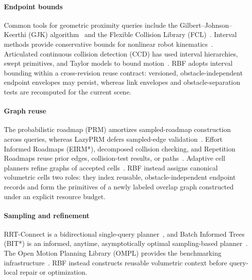 \documentclass[journal]{IEEEtran}
\newcommand{\rbf}{RBF}
\begin{document}
\paragraph{Endpoint bounds}
\label{sec:related_endpoint_bounds}
Common tools for geometric proximity queries include the
Gilbert--Johnson--Keerthi (GJK) algorithm~\cite{gilbert1988fast} and the
  Flexible Collision Library (FCL)~\cite{pan2012fcl}. Interval methods provide
conservative bounds for nonlinear robot kinematics~\cite{moore2009introduction,
merlet2009interval}. Articulated continuous collision detection (CCD) has used
interval hierarchies, swept primitives, and Taylor models to bound
motion~\cite{redon2005fast_artic,zhang2007taylor}. \rbf{} adopts interval
bounding within a cross-revision reuse contract: versioned,
obstacle-independent endpoint envelopes may persist, whereas link envelopes and
obstacle-separation tests are recomputed for the current scene.

\paragraph{Graph reuse}
The probabilistic roadmap (PRM) amortizes sampled-roadmap construction across
queries, whereas LazyPRM
defers sampled-edge validation~\cite{kavraki1996probabilistic,
bohlin2000path}. Effort Informed Roadmaps (EIRM*), decomposed collision
checking, and Repetition Roadmaps reuse prior edges, collision-test results, or
paths~\cite{hartmann2023eirm,hartmann2023decomposed,
lehner2018repetition}. Adaptive cell planners refine graphs of accepted
cells~\cite{lozanoperez1983spatial,brooks1985subdivision,wang2015soft}. \rbf{}
instead assigns canonical volumetric cells two roles: they index reusable,
obstacle-independent endpoint records and form the primitives of a newly
labeled overlap graph constructed under an explicit resource budget.

\paragraph{Sampling and refinement}
RRT-Connect is a bidirectional single-query planner~\cite{kuffner2000rrt}, and
Batch Informed Trees (BIT*) is an informed, anytime, asymptotically optimal sampling-based
planner~\cite{gammell2015batch}. The Open Motion Planning Library (OMPL)
provides the benchmarking infrastructure~\cite{sucan2012ompl}. \rbf{} instead
constructs reusable volumetric context before query-local repair or optimization.

\end{document}
